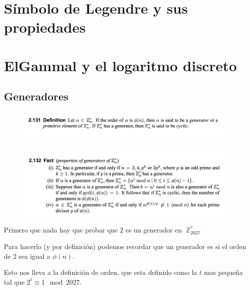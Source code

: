 \documentclass[12pt, fleqn]{report}                             %
\theoremstyle{break}                                            %
\DeclareMathOperator \Integers     {\mathbb{Z}}                 %
\begin{document}
\restoregeometry                                                    %
\nopagecolor

\tableofcontents{}
\label{sec:Index}

\clearpage
\large


\chapter{Símbolo de Legendre y sus propiedades}

  

\chapter{ElGammal y el logaritmo discreto}

  \section{Generadores}

  \begin{figure}[h]
      \includegraphics[width=\textwidth]{Gammal2}
      \caption{\cite{Menezes}}
  \end{figure}

  \begin{figure}[h]
    \includegraphics[width=\textwidth]{Gammal3}
    \caption{\cite{Menezes}}
  \end{figure}

    Primero que nada hay que probar que $2$ es un generador en $\Integers_{2027}^*$ 

    Para hacerlo (y por definición) podemos recordar que un generador es si el orden de $2$ sea igual a $\phi(n)$.

    Esto nos lleva a la definición de orden, que esta definido como la $t$ mas pequeña tal que $2^t \equiv 1 \mod{2027}$.
\end{document}
